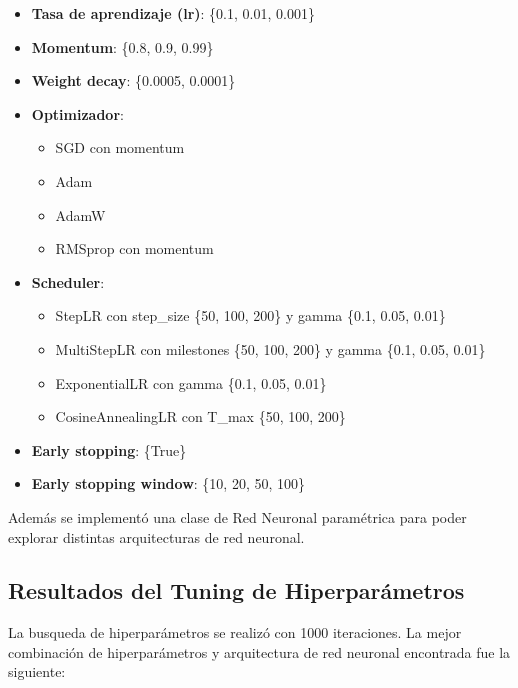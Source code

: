 \documentclass[
  a4paper,
]{article}
\begin{document}
\begin{itemize}
    \item \textbf{Tasa de aprendizaje (lr)}: \{0.1, 0.01, 0.001\}
    \item \textbf{Momentum}: \{0.8, 0.9, 0.99\}
    \item \textbf{Weight decay}: \{0.0005, 0.0001\}
    \item \textbf{Optimizador}:
    \begin{itemize}
        \item SGD con momentum
        \item Adam
        \item AdamW
        \item RMSprop con momentum
    \end{itemize}
    \item \textbf{Scheduler}:
    \begin{itemize}
        \item StepLR con step\_size \{50, 100, 200\} y gamma \{0.1, 0.05, 0.01\}
        \item MultiStepLR con milestones \{50, 100, 200\} y gamma \{0.1, 0.05, 0.01\}
        \item ExponentialLR con gamma \{0.1, 0.05, 0.01\}
        \item CosineAnnealingLR con T\_max \{50, 100, 200\}
    \end{itemize}
    \item \textbf{Early stopping}: \{True\}
    \item \textbf{Early stopping window}: \{10, 20, 50, 100\}
\end{itemize}

Además se implementó una clase de Red Neuronal paramétrica para poder
explorar distintas arquitecturas de red neuronal.

\hypertarget{resultados-del-tuning-de-hiperparuxe1metros}{%
\subsection{Resultados del Tuning de
Hiperparámetros}\label{resultados-del-tuning-de-hiperparuxe1metros}}

La busqueda de hiperparámetros se realizó con 1000 iteraciones. La mejor
combinación de hiperparámetros y arquitectura de red neuronal encontrada
fue la siguiente:
\end{document}
